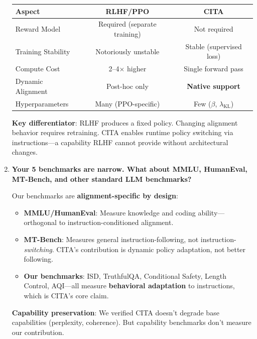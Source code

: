 \begin{enumerate}[label=\textbf{Q\arabic*.}, leftmargin=*, itemsep=8pt]
\begin{table}[H]
\centering
\small
\begin{tabular}{@{}lcc@{}}
\toprule
\textbf{Aspect} & \textbf{RLHF/PPO} & \textbf{CITA} \\
\midrule
Reward Model & Required (separate training) & Not required \\
\hline
Training Stability & Notoriously unstable & Stable (supervised loss) \\
\hline
Compute Cost & 2--4$\times$ higher & Single forward pass \\
\hline
Dynamic Alignment & Post-hoc only & \textbf{Native support} \\
\hline
Hyperparameters & Many (PPO-specific) & Few ($\beta$, $\lambda_{\text{KL}}$) \\
\bottomrule
\end{tabular}
\end{table}

\textbf{Key differentiator}: RLHF produces a fixed policy. Changing alignment behavior requires retraining. CITA enables runtime policy switching via instructions---a capability RLHF cannot provide without architectural changes.

\vspace{4mm}

\item \textbf{Your 5 benchmarks are narrow. What about MMLU, HumanEval, MT-Bench, and other standard LLM benchmarks?}

 Our benchmarks are \textbf{alignment-specific by design}:

\begin{itemize}[leftmargin=*,itemsep=2pt]
    \item \textbf{MMLU/HumanEval}: Measure knowledge and coding ability---orthogonal to instruction-conditioned alignment.

    \item \textbf{MT-Bench}: Measures general instruction-following, not instruction-\textit{switching}. CITA's contribution is dynamic policy adaptation, not better following.

    \item \textbf{Our benchmarks}: ISD, TruthfulQA, Conditional Safety, Length Control, AQI---all measure \textbf{behavioral adaptation} to instructions, which is CITA's core claim.
\end{itemize}

\textbf{Capability preservation}: We verified CITA doesn't degrade base capabilities (perplexity, coherence). But capability benchmarks don't measure our contribution.


\end{enumerate}
